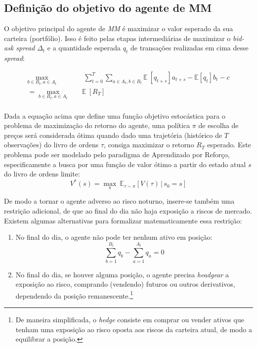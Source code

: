 \subsection{Definição do objetivo do agente de MM}
O objetivo principal do agente de \textit{MM} é maximizar o valor esperado da sua carteira (portfólio). Isso é feito pelas etapas intermediárias de maximizar o \textit{bid-ask spread} $\Delta_{t}$ e a quantidade esperada $q_{t}$ de transações realizadas em cima desse \textit{spread}:

\begin{equation}
	\begin{aligned}
		\max_{b \in B_{t}, a \in A_{t}} \quad &  \ \sum_{t=0}^{T} \sum_{a \in A_t, b \in B_t} \mathbb{E} \ [q_{t + s}]a_{t + s} - \mathbb{E} [ q_{t} ] b_{t} - c \\
		= \max_{b \in B_{t}, a \in A_{t}} \quad &  \mathbb{E} \ [R_T] 	\label{eq:target_fct}\\
	\end{aligned}
\end{equation}

Dada a equação acima que define uma função objetivo estocástica para  o problema de maximização do retorno do agente, uma política $\pi$ de escolha de preços será considerada ótima quando dado uma trajetória (histórico de $T$ observações) do livro de ordens $\tau$, consiga maximizar o retorno $R_{T}$ esperado. Este problema pode ser modelado pelo paradigma de Aprendizado por Reforço, especificamente a busca por uma função de valor ótimo a partir do estado atual $s$ do livro de ordens limite:
\begin{equation}
	V^{*}(s) = \underset{\pi}{\max} \ \mathbb{E}_{\tau \sim \pi} \left[ V(\tau) \, | \, s_0 = s \right]
\end{equation}

De modo a tornar o agente adverso ao risco noturno, insere-se também uma restrição adicional, de que ao final do dia não haja exposição a riscos de mercado. 
Existem algumas alternativas para formalizar matematicamente essa restrição:
\begin{enumerate}
    \item No final do dia, o agente não pode ter nenhum ativo em posição: 
    \begin{equation}
        \sum_{b=1}^{B_t} q_b  - \sum_{a=1}^{A_t} q_a = 0\label{eq:eod_restriction}
    \end{equation}
    \item No final do dia, se houver alguma posição, o agente precisa \textit{headgear} a exposição ao risco, comprando (vendendo) futuros ou outros derivativos, dependendo da posição remanescente.\footnote{De maneira simplificada, o \textit{hedge} consiste em comprar ou vender ativos que tenham uma exposição ao risco oposta aos riscos da carteira atual, de modo a equilibrar a posição.}
\end{enumerate}

